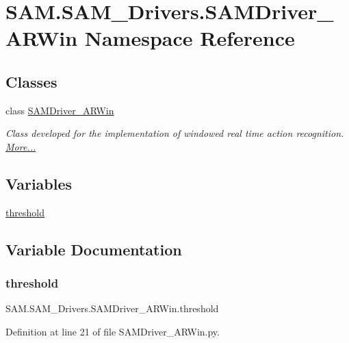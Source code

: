 \hypertarget{namespaceSAM_1_1SAM__Drivers_1_1SAMDriver__ARWin}{}\section{S\+A\+M.\+S\+A\+M\+\_\+\+Drivers.\+S\+A\+M\+Driver\+\_\+\+A\+R\+Win Namespace Reference}
\label{namespaceSAM_1_1SAM__Drivers_1_1SAMDriver__ARWin}
\subsection*{Classes}
\begin{DoxyCompactItemize}
\item 
class \hyperlink{group__icubclient__SAM__Drivers_classSAM_1_1SAM__Drivers_1_1SAMDriver__ARWin_1_1SAMDriver__ARWin}{S\+A\+M\+Driver\+\_\+\+A\+R\+Win}
\begin{DoxyCompactList}\small\item\em Class developed for the implementation of windowed real time action recognition.  \hyperlink{group__icubclient__SAM__Drivers_classSAM_1_1SAM__Drivers_1_1SAMDriver__ARWin_1_1SAMDriver__ARWin}{More...}\end{DoxyCompactList}\end{DoxyCompactItemize}
\subsection*{Variables}
\begin{DoxyCompactItemize}
\item 
\hyperlink{namespaceSAM_1_1SAM__Drivers_1_1SAMDriver__ARWin_ab15a8ecb0a106df6c3288bacf0ce0cbd}{threshold}
\end{DoxyCompactItemize}


\subsection{Variable Documentation}
\mbox{\label{namespaceSAM_1_1SAM__Drivers_1_1SAMDriver__ARWin_ab15a8ecb0a106df6c3288bacf0ce0cbd}} 
\subsubsection{\texorpdfstring{threshold}{threshold}}
{\footnotesize\ttfamily S\+A\+M.\+S\+A\+M\+\_\+\+Drivers.\+S\+A\+M\+Driver\+\_\+\+A\+R\+Win.\+threshold}



Definition at line 21 of file S\+A\+M\+Driver\+\_\+\+A\+R\+Win.\+py.

